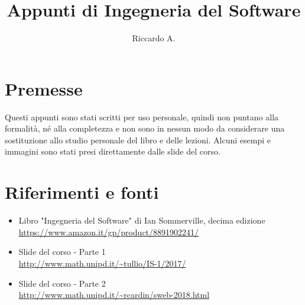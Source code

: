 

\author{Riccardo A.}
\title{Appunti di Ingegneria del Software}



\maketitle

\section*{Premesse}
Questi appunti sono stati scritti per uso personale, quindi non puntano alla formalità, né alla completezza e non sono in nessun modo da considerare una sostituzione allo studio personale del libro e delle lezioni. 
Alcuni esempi e immagini sono stati presi direttamente dalle slide del corso.

\section*{Riferimenti e fonti}
\begin{itemize}
\item Libro "Ingegneria del Software" di Ian Sommerville, decima edizione\\
\url{https://www.amazon.it/gp/product/8891902241/}
\item Slide del corso - Parte 1 \\
\url{http://www.math.unipd.it/~tullio/IS-1/2017/}
\item Slide del corso - Parte 2 \\
\url{http://www.math.unipd.it/~rcardin/sweb-2018.html}
\end{itemize}

\tableofcontents
\newpage



